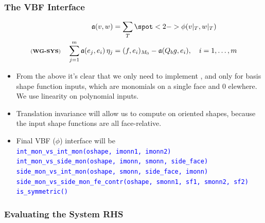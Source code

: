 \documentclass[compress]{beamer}
\begin{document}
\begin{frame}
  \frametitle{The VBF Interface}
  \vspace{-.40cm}
  \begin{align*}
    \mathfrak{a}(v,w) &= \sum_T { \spot<2->{\phi}(v|_T,w|_T) }\\
    \text{\scriptsize (\textbf{WG-SYS})} \quad \sum_{j=1}^m{\mathfrak{a}(e_j, e_i) \,\eta_j} &= (f, e_i)_{M_0} - \mathfrak{a}(Q_b g, e_i),
      \quad i=1,\dots,m
  \end{align*}
  \pause
  \begin{itemize}[<+->]
    \item From the above it's clear that we only need to implement , and only for basis shape function inputs,
      which are monomials on a single face and $0$ elewhere. We use linearity on polynomial inputs.
    \item Translation invariance will allow us to compute on oriented shapes, because the input shape functions are all face-relative.
    \item Final VBF ($\phi$) interface will be\\
    \uncover<+-> {
    \texttt{\small \textcolor{blue}{int\_mon\_vs\_int\_mon(oshape, imonn1, imonn2)}}\\
    \uncover<+-> {
    \texttt{\small \textcolor{blue}{int\_mon\_vs\_side\_mon(oshape, imonn, smonn, side\_face)}}\\
    \uncover<+-> {
    \texttt{\small \textcolor{blue}{side\_mon\_vs\_int\_mon(oshape, smonn, side\_face, imonn)}}\\
    \uncover<+-> {
    \texttt{\small \textcolor{blue}{side\_mon\_vs\_side\_mon\_fe\_contr({\scriptsize oshape, smonn1, sf1, smonn2, sf2})}}\\
    \uncover<+-> {
    \texttt{\small \textcolor{blue}{is\_symmetric() }}
    }}}}}
  \end{itemize}
\end{frame}


\subsubsection{Evaluating the System RHS}
\end{document}
